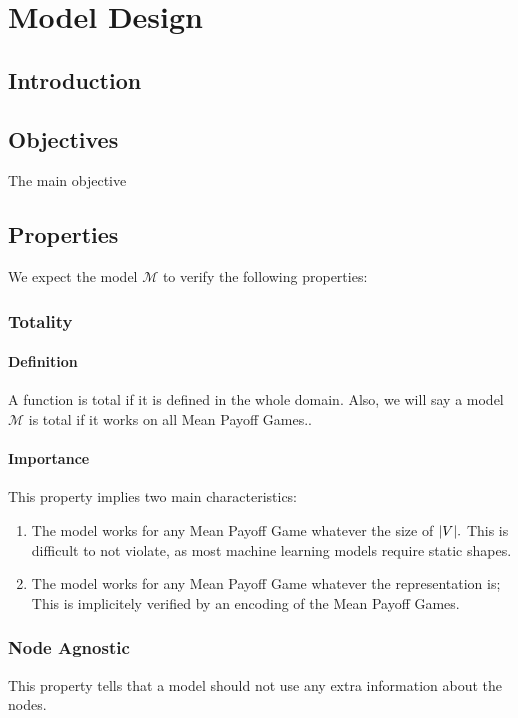 \chapter{Model Design}

\section{Introduction}

\section{Objectives}
The main objective

\section{Properties}
We expect the model $\mathcal{M}$ to verify the following properties:

\subsection{Totality}
\subsubsection{Definition}
A function is total if it is defined in the whole domain.
\newline Also, we will say a model $\mathcal{M}$ is total if it works on all Mean Payoff Games..
\subsubsection{Importance}
This property implies two main characteristics:
\begin{enumerate}
	\item The model works for any Mean Payoff Game whatever the size of $\lvert V \rvert.$ This is difficult to not violate, as most machine learning models require static shapes.
	\item The model works for any Mean Payoff Game whatever the representation is; This is implicitely verified by an encoding of the Mean Payoff Games.
\end{enumerate}

\subsection{Node Agnostic}
This property tells that a model should not use any extra information about the nodes.
